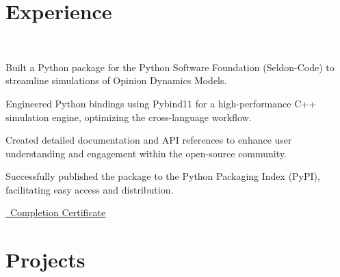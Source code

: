 \documentclass[]{resume}
\begin{document}
\begin{minipage}[t]{0.60\textwidth}


\section{Experience}
\\
\vspace{\topsep}
\begin{tightemize}
\item Built a Python package for the Python Software Foundation (Seldon-Code) to streamline simulations of Opinion Dynamics Models.
\item Engineered Python bindings using Pybind11 for a high-performance C++ simulation engine, optimizing the cross-language workflow.
\item Created detailed documentation and API references to enhance user understanding and engagement within the open-source community.
\item Successfully published the package to the Python Packaging Index (PyPI), facilitating easy access and distribution.
\item \href{https://github.com/User-DK/Resume/blob/main/assets/gsoc_completion_certificate_2024.jpg}{\faLink\ \underline{Completion Certificate} }
\end{tightemize}
\sectionsep

\section{Projects}


\end{minipage}
\end{document}
